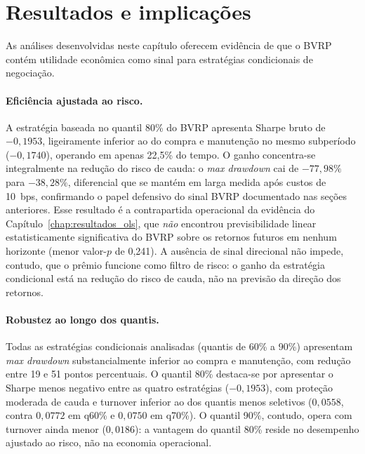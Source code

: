 \section{Resultados e implicações}
\label{sec:cap7_sintese}

As análises desenvolvidas neste capítulo oferecem evidência de que o BVRP contém
utilidade econômica como sinal para estratégias condicionais de negociação.

\paragraph{Eficiência ajustada ao risco.} A estratégia baseada no quantil 80\% do BVRP apresenta Sharpe bruto de
$-0{,}1953$, ligeiramente inferior ao do compra e manutenção no mesmo
subperíodo ($-0{,}1740$), operando em apenas 22{,}5\% do tempo. O ganho
concentra-se integralmente na redução do risco de cauda: o \textit{max
drawdown} cai de $-77{,}98\%$ para $-38{,}28\%$, diferencial que se mantém
em larga medida após custos de 10~bps, confirmando o papel defensivo do sinal
BVRP documentado nas seções anteriores. Esse resultado é a contrapartida operacional da evidência do
Capítulo~\ref{chap:resultados_ols}, que \emph{não} encontrou previsibilidade
linear estatisticamente significativa do BVRP sobre os retornos futuros em
nenhum horizonte (menor valor-$p$ de 0{,}241). A ausência de sinal direcional
não impede, contudo, que o prêmio funcione como filtro de risco: o ganho da
estratégia condicional está na redução do risco de cauda, não na previsão da
direção dos retornos.

\paragraph{Robustez ao longo dos quantis.} Todas as estratégias condicionais analisadas (quantis de 60\% a 90\%)
apresentam \textit{max drawdown} substancialmente inferior ao compra e
manutenção, com redução entre 19 e 51 pontos percentuais. O quantil 80\%
destaca-se por apresentar o Sharpe menos negativo entre as quatro estratégias
($-0{,}1953$), com proteção moderada de cauda e turnover inferior ao dos
quantis menos seletivos ($0{,}0558$, contra $0{,}0772$ em q60\% e $0{,}0750$
em q70\%). O quantil 90\%, contudo, opera com turnover ainda menor
($0{,}0186$): a vantagem do quantil 80\% reside no desempenho ajustado ao
risco, não na economia operacional.

